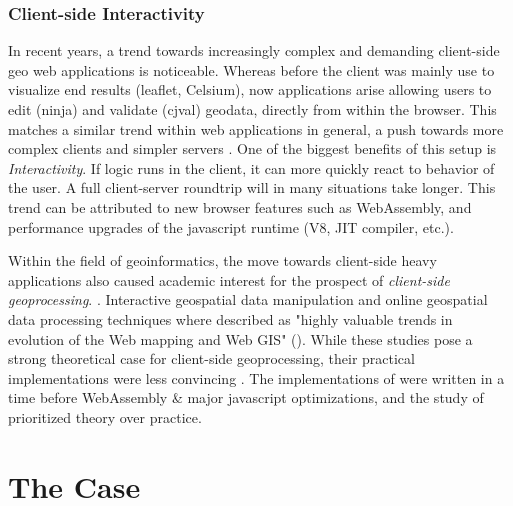\subsubsection*{Client-side Interactivity}
In recent years, a trend towards increasingly complex and demanding client-side geo web applications is noticeable.  
Whereas before the client was mainly use to visualize end results (leaflet, Celsium), now applications arise allowing users to edit (ninja) and validate (cjval) geodata, directly from within the browser. 
This matches a similar trend within web applications in general, a push towards more complex clients and simpler servers \cite{panidi_hybrid_2015}.
One of the biggest benefits of this setup is \emph{Interactivity}. If logic runs in the client, it can more quickly react to behavior of the user. A full client-server roundtrip will in many situations take longer.
This trend can be attributed to new browser features such as WebAssembly, and performance upgrades of the javascript runtime (V8, JIT compiler, etc.).

Within the field of geoinformatics, the move towards client-side heavy applications also caused academic interest for the prospect of \emph{client-side geoprocessing}. \cite{kulawiak_analysis_2019, panidi_hybrid_2015, hamilton_client-side_2014}. 
Interactive geospatial data manipulation and online geospatial data processing techniques where described as "highly valuable trends in evolution of the Web mapping and Web GIS" (\cite{panidi_hybrid_2015}). 
While these studies pose a strong theoretical case for client-side geoprocessing, their practical implementations were less convincing . 
The implementations of \cite{panidi_hybrid_2015, hamilton_client-side_2014} were written in a time before WebAssembly \& major javascript optimizations, and the study of \cite{kulawiak_analysis_2019} prioritized theory over practice. 


\section{ The Case }


